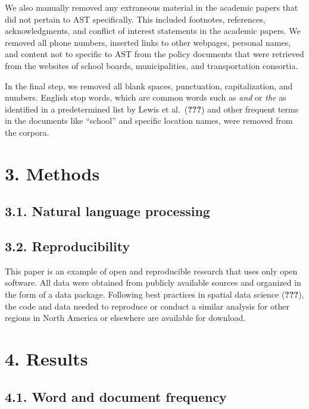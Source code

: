 \documentclass[]{elsarticle} %
\begin{document}
We also manually removed any extraneous material in the academic papers
that did not pertain to AST specifically. This included footnotes,
references, acknowledgments, and conflict of interest statements in the
academic papers. We removed all phone numbers, inserted links to other
webpages, personal names, and content not to specific to AST from the
policy documents that were retrieved from the websites of school boards,
municipalities, and transportation consortia.

In the final step, we removed all blank spaces, punctuation,
capitalization, and numbers. English stop words, which are common words
such as \emph{and} or \emph{the} as identified in a predetermined list
by Lewis et al.~({\textbf{???}}) and other frequent terms in the
documents like ``school'' and specific location names, were removed from
the corpora.

\hypertarget{methods}{%
\section{3. Methods}\label{methods}}

\hypertarget{natural-language-processing}{%
\subsection{3.1. Natural language
processing}\label{natural-language-processing}}

\hypertarget{reproducibility}{%
\subsection{3.2. Reproducibility}\label{reproducibility}}

This paper is an example of open and reproducible research that uses
only open software. All data were obtained from publicly available
sources and organized in the form of a data package. Following best
practices in spatial data science ({\textbf{???}}), the code and data
needed to reproduce or conduct a similar analysis for other regions in
North America or elsewhere are available for download.

\hypertarget{results}{%
\section{4. Results}\label{results}}

\hypertarget{word-and-document-frequency}{%
\subsection{4.1. Word and document
frequency}\label{word-and-document-frequency}}
\end{document}
